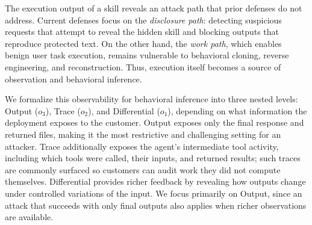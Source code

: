 \documentclass[letterpaper,twocolumn,10pt]{article}
\newcommand{\muxi}[1]{\textcolor{olive}{Muxi: #1}}
\begin{document}
The execution output of a skill reveals an attack path that prior defenses do not address. 
Current defenses focus on the \emph{disclosure path}: detecting suspicious requests that attempt to reveal the hidden skill and blocking outputs that reproduce protected text. 
On the other hand, the \emph{work path}, which enables benign user task execution, remains vulnerable to behavioral cloning, reverse engineering, and reconstruction. Thus, execution itself becomes a source of observation and behavioral inference.


We formalize this observability for behavioral inference into three nested levels: Output ($o_3$), Trace ($o_2$), and Differential ($o_1$), depending on what information the deployment exposes to the customer.
Output exposes only the final response and returned files, making it the most restrictive and challenging setting for an attacker. Trace additionally exposes the agent’s intermediate tool activity, including which tools were called, their inputs, and returned results; such traces are commonly surfaced so customers can audit work they did not compute themselves. 
Differential provides richer feedback by revealing how outputs change under controlled variations of the input. We focus primarily on Output, since an attack that succeeds with only final outputs also applies when richer observations are available.
\end{document}
